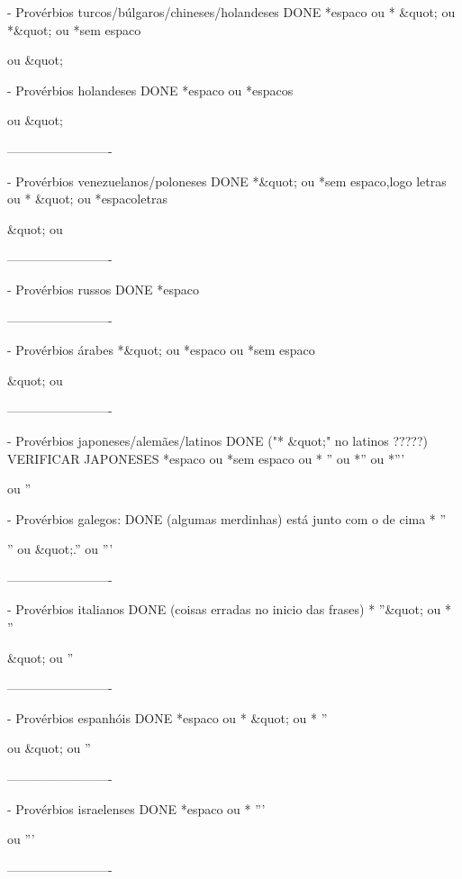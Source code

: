 - Provérbios turcos/búlgaros/chineses/holandeses                DONE
*{espaco} ou * &quot; ou *&quot; ou *{sem espaco}

\n ou &quot;

- Provérbios holandeses                                         DONE
*{espaco} ou *{espacos}

\n ou &quot;


-------------------------


- Provérbios venezuelanos/poloneses                                       DONE
*&quot; ou *{sem espaco,logo letras} ou * &quot; ou *{espaco}{letras}

&quot; ou \n


-------------------------


- Provérbios russos                                                      DONE
*{espaco}

\n


-------------------------


- Provérbios árabes
*&quot; ou *{espaco} ou *{sem espaco}

&quot; ou \n


-------------------------


- Provérbios japoneses/alemães/latinos                                   DONE ("* &quot;" no latinos ?????) VERIFICAR JAPONESES
*{espaco} ou *{sem espaco} ou * '' ou *'' ou *'''

\n ou ''\n

- Provérbios galegos:                                                    DONE (algumas merdinhas) está junto com o de cima
* ''

'' ou &quot;.'' ou '''


-------------------------


- Provérbios italianos                                                   DONE (coisas erradas no inicio das frases)
* ''&quot; ou * ''

&quot; ou ''\n


-------------------------


- Provérbios espanhóis                                                   DONE
*{espaco} ou * &quot; ou * ''

\n ou &quot; ou ''\n


-------------------------


- Provérbios israelenses                                                 DONE
*{espaco} ou * '''

\n ou '''\n


-------------------------


